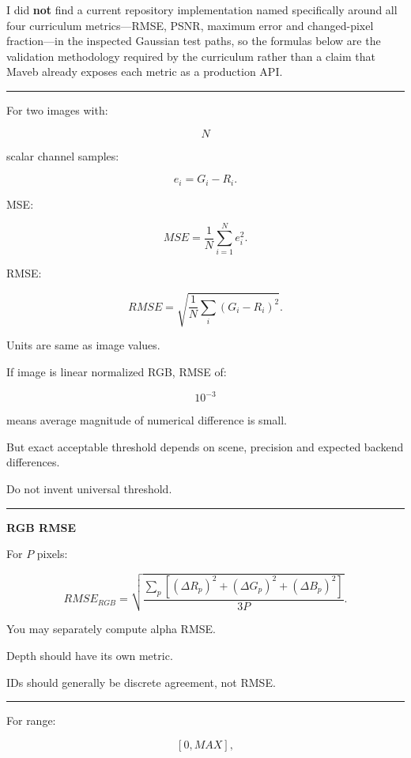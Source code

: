 I did \textbf{not} find a current repository implementation named specifically around all four curriculum metrics---RMSE, PSNR, maximum error and changed-pixel fraction---in the inspected Gaussian test paths, so the formulas below are the validation methodology required by the curriculum rather than a claim that Maveb already exposes each metric as a production API.

\begin{center}\rule{0.5\linewidth}{0.5pt}\end{center}

For two images with:

\[
N
\]

scalar channel samples:

\[
e_i=
G_i-R_i.
\]

MSE:

\[
\boxed{
MSE=
\frac1N
\sum_{i=1}^{N}
e_i^2.
}
\]

RMSE:

\[
\boxed{
RMSE=
\sqrt{
\frac1N
\sum_i
(G_i-R_i)^2
}.
}
\]

Units are same as image values.

If image is linear normalized RGB, RMSE of:

\[
10^{-3}
\]

means average magnitude of numerical difference is small.

But exact acceptable threshold depends on scene, precision and expected backend differences.

Do not invent universal threshold.

\begin{center}\rule{0.5\linewidth}{0.5pt}\end{center}

\textbf{RGB RMSE}

For \(P\) pixels:

\[
\boxed{
RMSE_{RGB}
=
\sqrt{
\frac{
\sum_{p}
[
(\Delta R_p)^2+
(\Delta G_p)^2+
(\Delta B_p)^2
]
}{
3P
}
}.
}
\]

You may separately compute alpha RMSE.

Depth should have its own metric.

IDs should generally be discrete agreement, not RMSE.

\begin{center}\rule{0.5\linewidth}{0.5pt}\end{center}

For range:

\[
[0,MAX],
\]

